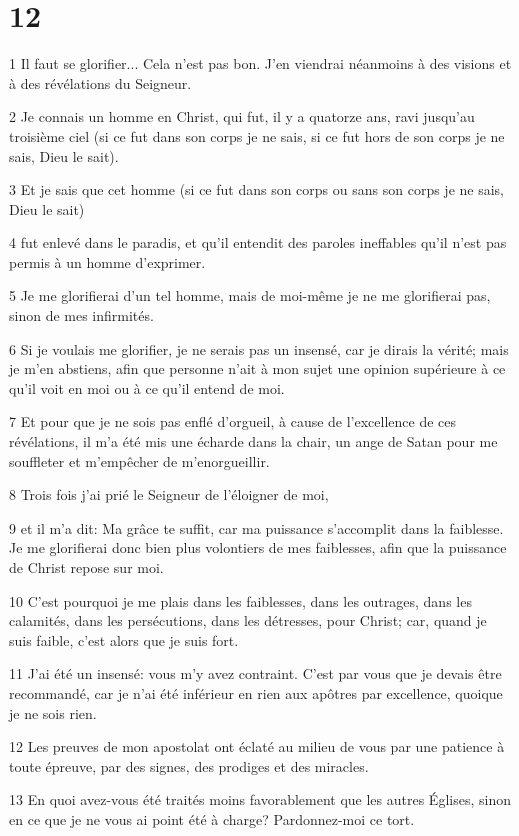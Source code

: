 \chapter{12}

\par 1 Il faut se glorifier... Cela n'est pas bon. J'en viendrai néanmoins à des visions et à des révélations du Seigneur.
\par 2 Je connais un homme en Christ, qui fut, il y a quatorze ans, ravi jusqu'au troisième ciel (si ce fut dans son corps je ne sais, si ce fut hors de son corps je ne sais, Dieu le sait).
\par 3 Et je sais que cet homme (si ce fut dans son corps ou sans son corps je ne sais, Dieu le sait)
\par 4 fut enlevé dans le paradis, et qu'il entendit des paroles ineffables qu'il n'est pas permis à un homme d'exprimer.
\par 5 Je me glorifierai d'un tel homme, mais de moi-même je ne me glorifierai pas, sinon de mes infirmités.
\par 6 Si je voulais me glorifier, je ne serais pas un insensé, car je dirais la vérité; mais je m'en abstiens, afin que personne n'ait à mon sujet une opinion supérieure à ce qu'il voit en moi ou à ce qu'il entend de moi.
\par 7 Et pour que je ne sois pas enflé d'orgueil, à cause de l'excellence de ces révélations, il m'a été mis une écharde dans la chair, un ange de Satan pour me souffleter et m'empêcher de m'enorgueillir.
\par 8 Trois fois j'ai prié le Seigneur de l'éloigner de moi,
\par 9 et il m'a dit: Ma grâce te suffit, car ma puissance s'accomplit dans la faiblesse. Je me glorifierai donc bien plus volontiers de mes faiblesses, afin que la puissance de Christ repose sur moi.
\par 10 C'est pourquoi je me plais dans les faiblesses, dans les outrages, dans les calamités, dans les persécutions, dans les détresses, pour Christ; car, quand je suis faible, c'est alors que je suis fort.
\par 11 J'ai été un insensé: vous m'y avez contraint. C'est par vous que je devais être recommandé, car je n'ai été inférieur en rien aux apôtres par excellence, quoique je ne sois rien.
\par 12 Les preuves de mon apostolat ont éclaté au milieu de vous par une patience à toute épreuve, par des signes, des prodiges et des miracles.
\par 13 En quoi avez-vous été traités moins favorablement que les autres Églises, sinon en ce que je ne vous ai point été à charge? Pardonnez-moi ce tort.
